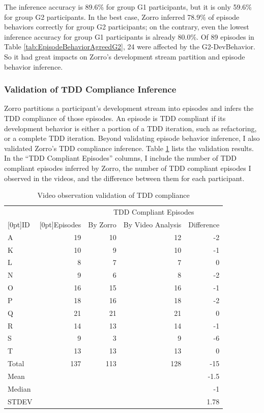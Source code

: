 The inference accuracy is 89.6\% for group G1 participants, but it 
is only 59.6\% for group G2 participants. In the best case, Zorro 
inferred 78.9\% of episode behaviors correctly for group G2 participants;
on the contrary, even the lowest inference accuracy for group G1
participants is already 80.0\%. Of 89 episodes in 
Table \ref{tab:EpisodeBehaviorAgreedG2}, 24 were affected by the 
G2-DevBehavior. So it had great impacts on Zorro's development 
stream partition and episode behavior inference.

\subsubsection{Validation of TDD Compliance Inference}
Zorro partitions a participant's development stream into episodes and
infers the TDD compliance of those episodes. An episode is TDD
compliant if its development behavior is either a portion of a
TDD iteration, such as refactoring, or a complete TDD iteration. 
Beyond validating episode behavior inference, I also validated
Zorro's TDD compliance inference. Table \ref{tab:TDDCompliantEpisodeNumber} 
lists the validation results. In the ``TDD Compliant Episodes''
columns, I include the number of TDD compliant episodes inferred 
by Zorro, the number of TDD compliant episodes I observed in the
videos, and the difference between them for each participant. 
\begin{table}[!ht]
\centering
  \begin{tabular}{|l|r|r|r|r|}
  \hline
    &  &  \multicolumn{3}{c|}{TDD Compliant Episodes} \\ \cline{3-5}
    \raisebox{1.5ex}[0pt]{ID} & \raisebox{1.5ex}[0pt]{Episodes}  & 
     By Zorro &  By Video Analysis & Difference\\ \hline
    A       &  19   &  10    &  12  & -2  \\ \hline  
    K       &  10   &   9    &  10  & -1  \\ \hline
    L       &   8   &   7    &   7  &  0  \\ \hline  
    N       &   9   &   6    &   8  & -2  \\ \hline
    O       &  16   &  15    &  16  & -1  \\ \hline
    P       &  18   &  16    &  18  & -2  \\ \hline
    Q       &  21   &  21    &  21  &  0  \\ \hline
    R       &  14   &  13    &  14  & -1  \\ \hline
    S       &   9   &   3    &   9  & -6  \\ \hline
    T       &  13   &  13    &  13  &  0  \\ \hline
    Total   & 137   & 113    & 128  & -15 \\ \hline
    Mean    &      &        & 	& -1.5 \\ \hline
    Median  &      &        & 	& -1  \\ \hline
    STDEV   &      &        & 	& 1.78 \\ \hline
    \end{tabular}
  \caption{Video observation validation of TDD compliance}
  \label{tab:TDDCompliantEpisodeNumber} 
\end{table}
